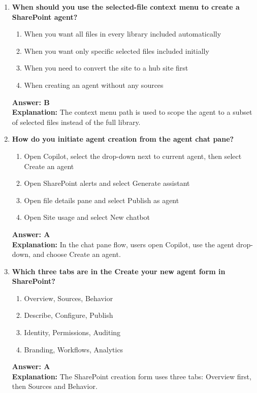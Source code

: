 \documentclass[10pt]{article}
\begin{document}
\begin{enumerate}[leftmargin=*]
\item \textbf{When should you use the selected-file context menu to create a SharePoint agent?}
\begin{enumerate}[label=\Alph*.]
  \item When you want all files in every library included automatically
  \item When you want only specific selected files included initially
  \item When you need to convert the site to a hub site first
  \item When creating an agent without any sources
\end{enumerate}
\textbf{Answer: B}\\
\textbf{Explanation:} The context menu path is used to scope the agent to a subset of selected files instead of the full library.

\item \textbf{How do you initiate agent creation from the agent chat pane?}
\begin{enumerate}[label=\Alph*.]
  \item Open Copilot, select the drop-down next to current agent, then select Create an agent
  \item Open SharePoint alerts and select Generate assistant
  \item Open file details pane and select Publish as agent
  \item Open Site usage and select New chatbot
\end{enumerate}
\textbf{Answer: A}\\
\textbf{Explanation:} In the chat pane flow, users open Copilot, use the agent drop-down, and choose Create an agent.

\item \textbf{Which three tabs are in the Create your new agent form in SharePoint?}
\begin{enumerate}[label=\Alph*.]
  \item Overview, Sources, Behavior
  \item Describe, Configure, Publish
  \item Identity, Permissions, Auditing
  \item Branding, Workflows, Analytics
\end{enumerate}
\textbf{Answer: A}\\
\textbf{Explanation:} The SharePoint creation form uses three tabs: Overview first, then Sources and Behavior.


\end{enumerate}
\end{document}
